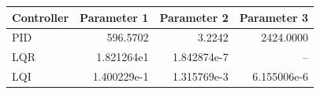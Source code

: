 \begin{tabular}{lrrr}\toprule
Controller & Parameter 1 & Parameter 2 & Parameter 3 \\
\midrule
PID & 596.5702 & 3.2242 & 2424.0000 \\
LQR & 1.821264e1 & 1.842874e-7 & -- \\
LQI & 1.400229e-1 & 1.315769e-3 & 6.155006e-6 \\
\bottomrule\end{tabular}

